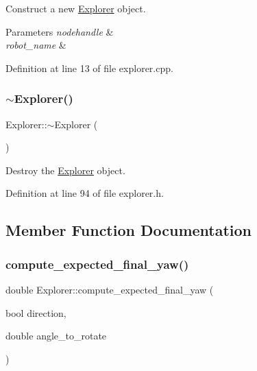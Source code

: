 Construct a new \hyperlink{class_explorer}{Explorer} object. 


\begin{DoxyParams}{Parameters}
{\em nodehandle} & \\
\hline
{\em robot\+\_\+name} & \\
\hline
\end{DoxyParams}


Definition at line 13 of file explorer.\+cpp.

\mbox{\label{class_explorer_aa1b0a71e92e003e9162a5ba99d843392}} 
\subsubsection{\texorpdfstring{$\sim$\+Explorer()}{~Explorer()}}
{\footnotesize\ttfamily Explorer\+::$\sim$\+Explorer (\begin{DoxyParamCaption}{ }\end{DoxyParamCaption})\hspace{0.3cm}{\ttfamily [inline]}}



Destroy the \hyperlink{class_explorer}{Explorer} object. 



Definition at line 94 of file explorer.\+h.



\subsection{Member Function Documentation}
\mbox{\label{class_explorer_a02c37b93448ed474f1bf0d03e2758ca2}} 
\subsubsection{\texorpdfstring{compute\+\_\+expected\+\_\+final\+\_\+yaw()}{compute\_expected\_final\_yaw()}}
{\footnotesize\ttfamily double Explorer\+::compute\+\_\+expected\+\_\+final\+\_\+yaw (\begin{DoxyParamCaption}\item[{bool}]{direction,  }\item[{double}]{angle\+\_\+to\+\_\+rotate }\end{DoxyParamCaption})}



